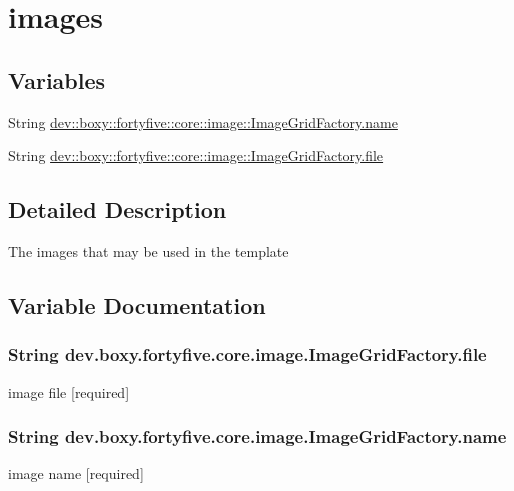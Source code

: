 \hypertarget{group__images}{
\section{images}
\label{dd/dac/group__images}
}
\subsection*{Variables}
\begin{DoxyCompactItemize}
\item 
String \hyperlink{group__images_ga92af5fa9ec1dfb784ba7eb249a3f8314}{dev::boxy::fortyfive::core::image::ImageGridFactory.name}
\item 
String \hyperlink{group__images_gac0a4aac7b16c874035504c026e244cbe}{dev::boxy::fortyfive::core::image::ImageGridFactory.file}
\end{DoxyCompactItemize}


\subsection{Detailed Description}
The images that may be used in the template 

\subsection{Variable Documentation}
\hypertarget{group__images_gac0a4aac7b16c874035504c026e244cbe}{
\subsubsection[{file}]{\setlength{\rightskip}{0pt plus 5cm}String {\bf dev.boxy.fortyfive.core.image.ImageGridFactory.file}}}
\label{dd/dac/group__images_gac0a4aac7b16c874035504c026e244cbe}
image file \mbox{[}required\mbox{]} \hypertarget{group__images_ga92af5fa9ec1dfb784ba7eb249a3f8314}{
\subsubsection[{name}]{\setlength{\rightskip}{0pt plus 5cm}String {\bf dev.boxy.fortyfive.core.image.ImageGridFactory.name}}}
\label{dd/dac/group__images_ga92af5fa9ec1dfb784ba7eb249a3f8314}
image name \mbox{[}required\mbox{]} 